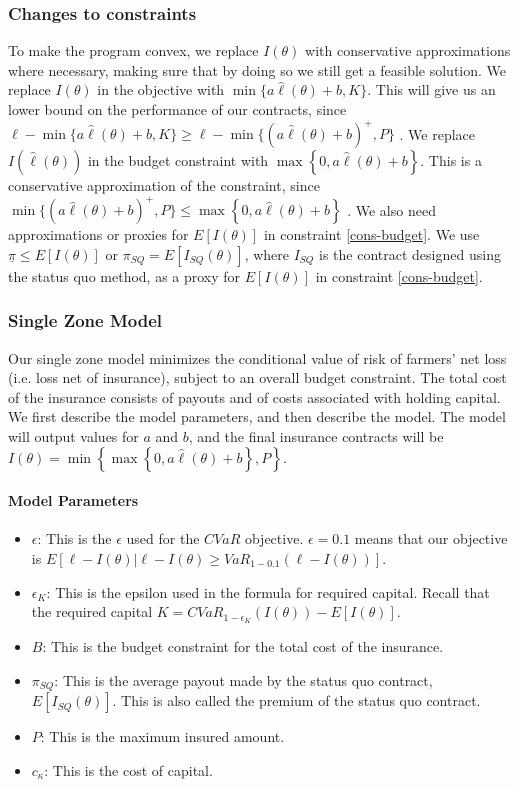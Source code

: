 \documentclass[11pt]{article}
\begin{document}
  \subsubsection{Changes to constraints}
  To make the program convex, we replace $I(\theta)$ with conservative approximations where necessary, making sure that by doing so we still get a feasible solution. We replace $I(\theta)$ in the objective with $\min \{ a\hat{\ell}(\theta) + b,K \}$. This will give us an lower bound on the performance of our contracts, since $\ell - \min \{ a\hat{\ell}(\theta) + b,K \} \geq  \ell - \min \{ (a\hat{\ell}(\theta) + b)^+,P \}$ . We replace $I(\hat{\ell}(\theta))$ in the budget constraint with $\max \left \{ 0,a\hat{\ell}(\theta) + b \right \} $. This is a conservative approximation of the constraint, since $\min \{ (a\hat{\ell}(\theta) + b)^+,P \}  \leq \max \left \{ 0,a\hat{\ell}(\theta) + b \right \}$ . We also need approximations or proxies for $E[I(\theta)]$ in constraint \ref{cons-budget}. We use $\underline{\pi} \leq E[I(\theta)]$ or $\pi_{SQ} = E[I_{SQ}(\theta)]$, where $I_{SQ}$ is the contract designed using the status quo method, as a proxy for $E[I(\theta)]$ in constraint \ref{cons-budget}. 
  
  \subsubsection{Single Zone Model}
  Our single zone model minimizes the conditional value of risk of farmers' net loss (i.e. loss net of insurance), subject to an overall budget constraint. The total cost of the insurance consists of payouts and of costs associated with holding capital. We first describe the model parameters, and then describe the model. The model will output values for $a$ and $b$, and the final insurance contracts will be $I(\theta) = \min \left \{\max \left \{0,a\hat{\ell}(\theta) + b \right \}, P \right \}$.
  \paragraph*{Model Parameters}
  \begin{itemize}
    \item $\epsilon$: This is the $\epsilon$ used for the $CVaR$ objective.  $\epsilon = 0.1$ means that our objective is $E[\ell - I(\theta)|\ell -I(\theta) \geq VaR_{1-0.1}\left ( \ell - I(\theta) \right )]$. 
    \item $\epsilon_K$: This is the epsilon used in the formula for required capital. Recall that the required capital $K = CVaR_{1-\epsilon_K}(I(\theta)) - E[I(\theta)]$.
    \item $B$: This is the budget constraint for the total cost of the insurance.
    \item $\pi_{SQ}$: This is the average payout made by the status quo contract, $E[I_{SQ}(\theta)]$. This is also called the premium of the status quo contract.  
    \item $P$: This is the maximum insured amount.
    \item $c_{\kappa}$: This is the cost of capital. 
\end{itemize}
  
\end{document}
